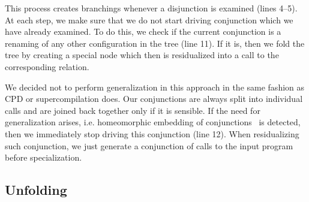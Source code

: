 This process creates branchings whenever a disjunction is examined (lines 4--5).
At each step, we make sure that we do not start driving conjunction which we have already examined.
To do this, we check if the current conjunction is a renaming of any other configuration in the tree (line 11).
If it is, then we fold the tree by creating a special node which then is residualized into a call to the corresponding relation.

We decided not to perform generalization in this approach in the same fashion as CPD or supercompilation does.
Our conjunctions are always split into individual calls and are joined back together only if it is sensible.
If the need for generalization arises, i.e. homeomorphic embedding of conjunctions~\cite{de1999conjunctive} is detected, then we immediately stop driving this conjunction (line 12).
When residualizing such conjunction, we just generate a conjunction of calls to the input program before specialization.




\subsection{Unfolding}

